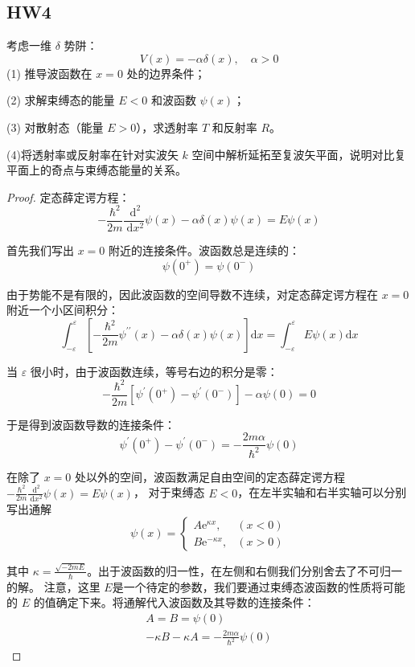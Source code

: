 \subsection{HW4}
\begin{1}
考虑一维 $\delta$ 势阱：
$$V(x)=-\alpha \delta(x), \quad \alpha>0$$
(1) 推导波函数在 $x=0$ 处的边界条件；

(2) 求解束缚态的能量 $E<0$ 和波函数 $\psi(x)$；

(3) 对散射态（能量 $E>0$），求透射率 $T$ 和反射率 $R$。

(4)将透射率或反射率在针对实波矢 $k$ 空间中解析延拓至复波矢平面，说明对比复平面上的奇点与束缚态能量的关系。
\end{1}
\begin{proof}
    定态薛定谔方程：
$$-\frac{\hbar^{2}}{2m} \frac{\mathrm{~d}^{2}}{\mathrm{~d} x^{2}} \psi(x)-\alpha \delta(x) \psi(x)=E \psi(x)$$

首先我们写出 $x=0$ 附近的连接条件。波函数总是连续的：
$$\psi(0^{+})=\psi(0^{-})$$

由于势能不是有限的，因此波函数的空间导数不连续，对定态薛定谔方程在 $x=0$ 附近一个小区间积分：
$$\int_{-\varepsilon}^{\varepsilon}\left[-\frac{\hbar^{2}}{2m} \psi^{\prime \prime}(x)-\alpha \delta(x) \psi(x)\right] \mathrm{d} x
=\int_{-\varepsilon}^{\varepsilon} E \psi(x) \mathrm{d} x$$

当 $\varepsilon$ 很小时，由于波函数连续，等号右边的积分是零：
$$-\frac{\hbar^{2}}{2m}\left[\psi^{\prime}(0^{+})
-\psi^{\prime}(0^{-})\right]-\alpha \psi(0)=0$$

于是得到波函数导数的连接条件：
$$\psi^{\prime}(0^{+})-\psi^{\prime}(0^{-})
=-\frac{2m \alpha}{\hbar^{2}} \psi(0)$$

在除了 $x=0$ 处以外的空间，波函数满足自由空间的定态薛定谔方程 $-\frac{\hbar^{2}}{2m} \frac{\mathrm{~d}^{2}}{\mathrm{~d} x^{2}} \psi(x)=E \psi(x)$，
对于束缚态 $E<0$，在左半实轴和右半实轴可以分别写出通解
$$\psi(x)=\begin{cases}
A \mathrm{e}^{\kappa x}, & (x<0) \\
B \mathrm{e}^{-\kappa x}, & (x>0)
\end{cases}$$

其中 $\kappa=\frac{\sqrt{-2mE}}{\hbar}$。出于波函数的归一性，在左侧和右侧我们分别舍去了不可归一的解。
注意，这里 $E$是一个待定的参数，我们要通过束缚态波函数的性质将可能的 $E$ 的值确定下来。将通解代入波函数及其导数的连接条件：
$$
\begin{gathered}
A=B=\psi(0) \\
-\kappa B-\kappa A=-\frac{2 m \alpha}{\hbar^{2}} \psi(0)
\end{gathered}
$$


\end{proof}
